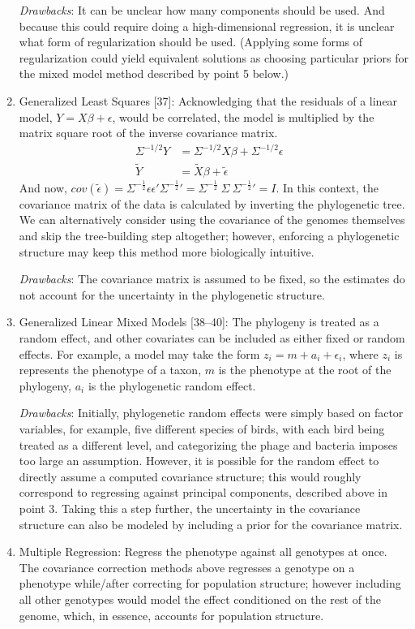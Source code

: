 \documentclass[12pt,twoside]{mitthesis-manusdown}
\begin{document}
\begin{enumerate}
  \emph{Drawbacks}: It can be unclear how many components should be
  used. And because this could require doing a high-dimensional
  regression, it is unclear what form of regularization should be used.
  (Applying some forms of regularization could yield equivalent
  solutions as choosing particular priors for the mixed model method
  described by point 5 below.)
\item
  Generalized Least Squares {[}37{]}: Acknowledging that the residuals
  of a linear model, \(Y = X\beta + \epsilon\), would be correlated, the
  model is multiplied by the matrix square root of the inverse
  covariance matrix.
  \begin{align*}
      \Sigma^{-1/2} Y &= \Sigma^{-1/2} X\beta + \Sigma^{-1/2} \epsilon & \nonumber \\
      \widetilde{Y} &= \widetilde{X}\beta + \widetilde{\epsilon} \nonumber
  \end{align*}
  And now,
  \(cov(\widetilde{\epsilon}) = \Sigma^{-\frac{1}{2}} \epsilon \epsilon' \Sigma^{-\frac{1}{2}}{'} = \Sigma^{-\frac{1}{2}} \  \Sigma \  \Sigma^{-\frac{1}{2}}{'} = I\).
  In this context, the covariance matrix of the data is calculated by
  inverting the phylogenetic tree. We can alternatively consider using
  the covariance of the genomes themselves and skip the tree-building
  step altogether; however, enforcing a phylogenetic structure may keep
  this method more biologically intuitive.

  \emph{Drawbacks}: The covariance matrix is assumed to be fixed, so the
  estimates do not account for the uncertainty in the phylogenetic
  structure.
\item
  Generalized Linear Mixed Models {[}38--40{]}: The phylogeny is treated
  as a random effect, and other covariates can be included as either
  fixed or random effects. For example, a model may take the form
  \(z_i = m + a_i + \epsilon_i\), where \(z_i\) is represents the
  phenotype of a taxon, \(m\) is the phenotype at the root of the
  phylogeny, \(a_i\) is the phylogenetic random effect.

  \emph{Drawbacks}: Initially, phylogenetic random effects were simply
  based on factor variables, for example, five different species of
  birds, with each bird being treated as a different level, and
  categorizing the phage and bacteria imposes too large an assumption.
  However, it is possible for the random effect to directly assume a
  computed covariance structure; this would roughly correspond to
  regressing against principal components, described above in point 3.
  Taking this a step further, the uncertainty in the covariance
  structure can also be modeled by including a prior for the covariance
  matrix.
\item
  Multiple Regression: Regress the phenotype against all genotypes at
  once. The covariance correction methods above regresses a genotype on
  a phenotype while/after correcting for population structure; however
  including all other genotypes would model the effect conditioned on
  the rest of the genome, which, in essence, accounts for population
  structure.


\end{enumerate}
\end{document}
